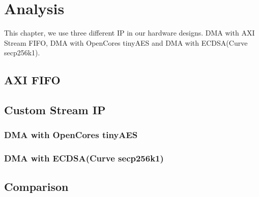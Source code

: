 
\chapter{Analysis}
\label{cha:Analysis}
This chapter, we use three different IP in our hardware designs. DMA with AXI Stream FIFO, 
DMA with OpenCores tinyAES and DMA with ECDSA(Curve secp256k1).

\section{AXI FIFO}
\label{sec:AXI FIFO}


\section{Custom Stream IP}
\label{sec:Custom Stream IP}

\subsection{DMA with OpenCores tinyAES}
\label{sec:DMA with OpenCores tinyAES}

\subsection{DMA with ECDSA(Curve secp256k1)}
\label{sec:DMA with ECDSA(Curve secp256k1)}
\section{Comparison}
\label{sec:Comparison}


